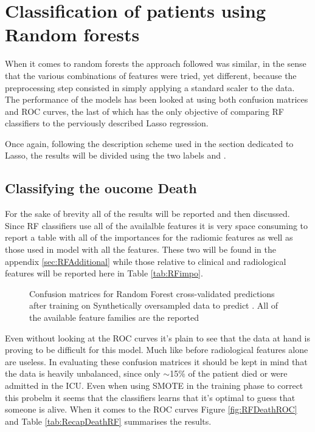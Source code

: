 \section{Classification of patients using Random forests}
When it comes to random forests the approach followed was similar, in the sense that the various combinations of features were tried, yet different, because the preprocessing step consisted in simply applying a standard scaler to the data.
The performance of the models has been looked at using both confusion matrices and ROC curves, the last of which has the only objective of comparing RF classifiers to the perviously described Lasso regression. 

Once again, following the description scheme used in the section dedicated to Lasso, the results will be divided using the two labels \icu and \death.

\subsection{Classifying the oucome Death}
For the sake of brevity all of the results will be reported and then discussed. Since RF classifiers use all of the availalble features it is very space consuming to report a table with all of the importances for the radiomic features as well as those used in model with all the features. These two will be found in the appendix \ref{sec:RFAdditional} while those relative to clinical and radiological features will be reported here in Table \ref{tab:RFimpo}.

\begin{figure}[H]
\centering
	\newline
        \caption{Confusion matrices for Random Forest cross-validated predictions after training on Synthetically oversampled data to predict \death. All of the available feature families are the reported}\label{fig:RFDeath}
\end{figure}

Even without looking at the ROC curves it's plain to see that the data at hand is proving to be difficult for this model. Much like before radiological features alone are useless.
In evaluating these confusion matrices it should be kept in mind that the data is heavily unbalanced, since only $\sim$15\% of the patient died or were admitted in the ICU.
Even when using SMOTE in the training phase to correct this probelm it seems that the classifiers learns that it's optimal to guess that someone is alive. When it comes to the ROC curves Figure \ref{fig:RFDeathROC} and Table \ref{tab:RecapDeathRF} summarises the results.

